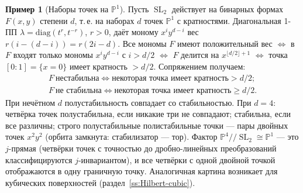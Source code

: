 \documentclass[11pt,a4paper]{article}
\theoremstyle{plain}
\theoremstyle{definition}
\newtheorem{example}[theorem]{Пример}
\theoremstyle{remark}
\newcommand{\PP}{\mathbb{P}}
\DeclareMathOperator{\SL}{SL}
\begin{document}
\begin{example}[Наборы точек на $\PP^1$]\label{ex:binary-forms}
Пусть $\SL_2$ действует на бинарных формах $F(x,y)$ степени $d$, т.\,е. на наборах $d$ точек
$\PP^1$ с кратностями. Диагональная 1-ПП $\lambda=\mathrm{diag}(t^{r},t^{-r})$, $r>0$, даёт моному
$x^iy^{d-i}$ вес $r(i-(d-i))=r(2i-d)$. Все мономы $F$ имеют положительный вес $\iff$ в $F$ входят только мономы $x^iy^{d-i}$ с
$i>d/2$ $\iff$ $F$ делится на $x^{\lfloor d/2\rfloor+1}$ $\iff$ точка $[0:1]=\{x=0\}$ имеет
кратность $>d/2$. Сопряжением получаем:
\begin{gather*}
F\ \text{нестабильна}\iff\text{некоторая точка имеет кратность}>d/2;\\
F\ \text{не стабильна}\iff\text{некоторая точка имеет кратность}\ge d/2 .
\end{gather*}
При нечётном $d$ полустабильность совпадает со стабильностью. При $d=4$: четвёрка точек
полустабильна, если никакие три не совпадают; стабильна, если все различны; строго полустабильные
полистабильные точки --- пары двойных точек $x^2y^2$ (орбита замкнута: стабилизатор --- тор).
Фактор $\PP^4/\!/\SL_2\cong\PP^1$ --- это $j$-прямая (четвёрки точек с точностью до дробно-линейных
преобразований классифицируются $j$-инвариантом), и все четвёрки с одной двойной точкой отображаются
в одну граничную точку. Аналогичная картина возникает для кубических поверхностей
(раздел~\ref{ss:Hilbert-cubic}).
\end{example}
\end{document}

